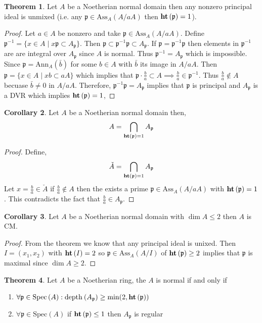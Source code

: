 \documentclass[12pt]{article}
\newcommand{\Ann}[2]{\mathrm{Ann}_{#1}\left(#2\right)}
\newcommand{\Ass}[2]{\mathrm{Ass}_{#1}\left( #2 \right)}
\newcommand{\Spec}[1]{\mathrm{Spec}\left( #1 \right)}
\newcommand{\depth}[2]{\mathrm{depth}_{#1}\left(#2\right)}
\newcommand{\p}{\mathfrak{p}}
\theoremstyle{remark}
\theoremstyle{definition}
\newtheorem{theorem}{Theorem}[section]
\newtheorem{corollary}[theorem]{Corollary}
\begin{document}
\begin{theorem}
Let $A$ be a Noetherian normal domain then any nonzero principal ideal is unmixed (i.e. any $\p \in \Ass{A}{A / a A}$ then $\height{\p} = 1$). 
\end{theorem}

\begin{proof}
Let $a \in A$ be nonzero and take $\p \in \Ass{A}{A / a A}$. Define $\p^{-1} = \{ x \in A \mid x \p \subset A_{\p} \}$. Then $\p \subset \p^{-1} \p \subset A_{\p}$. If $\p = \p^{-1} \p$ then elements in $\p^{-1}$ are are integral over $A_{\p}$ since $A$ is normal. Thus $\p^{-1} = A_{\p}$ which is impossible. Since $\p = \Ann{A}{\bar{b}}$ for some $b \in A$ with $\bar{b}$ its image in $A / a A$. Then $\p = \{ x \in A \mid x b \subset a A \}$ which implies that $\p \cdot \frac{b}{a} \subset A \implies \frac{b}{a} \in \p^{-1}$. Thus $\frac{b}{a} \notin A$ becuase $\bar{b} \neq 0$ in $A / a A$. Therefore, $\p^{-1} \p = A_{\p}$ implies that $\p$ is principal and $A_{\p}$ is a DVR which implies $\height{\p} = 1$, 
\end{proof}

\begin{corollary}
Let $A$ be a Noetherian normal domain then,
\[ A = \bigcap_{\height{\p} = 1} A_{\p} \]
\end{corollary}

\begin{proof}
Define,
\[ \check{A} = \bigcap_{\height{\p} = 1} A_{\p}\] 
Let $x = \frac{b}{a} \in \check{A}$ if $\frac{b}{a} \notin A$ then the exists a prime $\p \in \Ass{A}{A / aA}$ with $\height{\p} = 1$. This contradicts the fact that $\frac{b}{a} \in A_{\p}$.  
\end{proof}

\begin{corollary}
Let $A$ be a Noetherian normal domain with $\dim{A} \le 2$ then $A$ is CM.
\end{corollary}

\begin{proof}
From the theorem we know that any principal ideal is unixed. Then $I = (x_1, x_2)$ with $\mathbf{ht}\left( I \right) = 2$ so $\p \in \Ass{A}{A / I}$ of $\height{\p} \ge 2$ implies that $\p$ is maximal since $\dim{A} \ge 2$. 
\end{proof}

\begin{theorem}
Let $A$ be a Noetherian ring, the $A$ is normal if and only if 
\begin{enumerate}
\item $\forall \p \in \Spec{A} : \depth{}{A_{\p}} \ge \min(2, \height{\p})$
\item $\forall \p \in \Spec{A}$ if $\height{\p} \le 1$ then $A_{\p}$ is regular
\end{enumerate}
\end{theorem}
\end{document}
